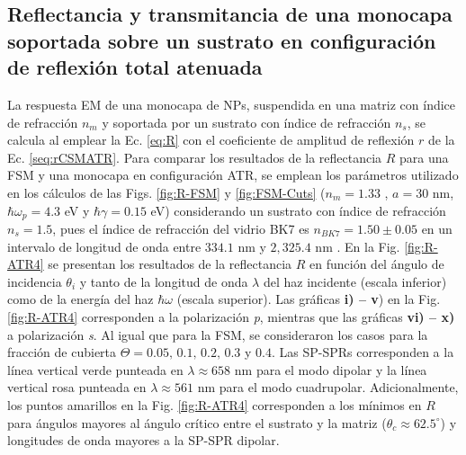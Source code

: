 	\subsection{Reflectancia y transmitancia de una monocapa soportada sobre un sustrato en configuración de reflexión total atenuada}
	\label{ssection:DrudeATR}

La respuesta EM de una monocapa de NPs, suspendida en una matriz con índice de refracción $n_m$ y soportada por un sustrato con índice de refracción $n_s$, se calcula al emplear la Ec.  \eqref{eq:R} con el coeficiente de amplitud de reflexión $r$ de la Ec.  \eqref{seq:rCSMATR}. Para comparar los resultados de la reflectancia $R$ para una FSM y una monocapa en configuración ATR, se emplean los parámetros utilizado en los cálculos de las Figs. \ref{fig:R-FSM} y \ref{fig:FSM-Cuts} ($n_m=1.33$ , $a=30$ nm, $\hbar\omega_p=4.3$ eV y  $\hbar\gamma = 0.15$ eV) considerando un sustrato con índice de refracción $n_s=1.5$, pues el índice de refracción del vidrio BK7 es $n_{BK7}=1.50\pm 0.05$ en un intervalo de longitud de onda entre $334.1$ nm y $2,325.4$ nm \cite{schott2019datasheet}. En la Fig.  \ref{fig:R-ATR4} se presentan los resultados de la reflectancia $R$ en función del ángulo de incidencia $\theta_i$ y tanto de la longitud de onda $\lambda$ del haz incidente (escala inferior) como de la energía del haz $\hbar\omega$ (escala superior). Las gráficas \textbf{i) -- v}) en la Fig. \ref{fig:R-ATR4}  corresponden a la polarización \emph{p}, mientras que las gráficas \textbf{vi) -- x)} a polarización \emph{s}. Al igual que para la FSM, se consideraron los casos para la fracción de cubierta $\Theta = 0.05,\,0.1,\,0.2,\,0.3$ y $0.4$. Las SP-SPRs corresponden a la línea vertical verde punteada en $\lambda \approx 658$ nm para el modo dipolar y la línea vertical rosa punteada en  $\lambda \approx 561$ nm para el modo cuadrupolar. Adicionalmente, los puntos amarillos en la Fig. \ref{fig:R-ATR4} corresponden a los mínimos en $R$ para ángulos mayores al ángulo crítico entre el sustrato y la matriz ($\theta_c\approx 62.5^\circ$) y longitudes de onda mayores a la SP-SPR dipolar.

